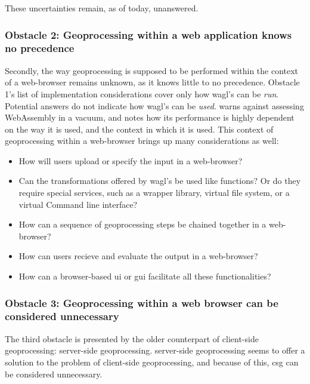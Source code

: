These uncertainties remain, as of today, unanswered.

\subsubsection*{Obstacle 2: Geoprocessing within a web application knows no precedence}

Secondly, the way geoprocessing is supposed to be performed within the context of a web-browser remains unknown, as it knows little to no precedence. Obstacle 1's list of implementation considerations cover only how \ac{wagl}'s can be \emph{run}. Potential answers do not indicate how \ac{wagl}'s can be \emph{used}. \cite{jangda_not_2019} warns against assessing WebAssembly in a vacuum, and notes how its performance is highly dependent on the way it is used, and the context in which it is used. This context of geoprocessing within a web-browser brings up many considerations as well: 

\begin{itemize}
  \item How will users upload or specify the input in a web-browser?
  \item Can the transformations offered by \ac{wagl}'s be used like functions? Or do they require special services, such as a wrapper library, virtual file system, or a virtual Command line interface? 
  \item How can a sequence of geoprocessing steps be chained together in a web-browser?
  \item How can users recieve and evaluate the output in a web-browser?
  \item How can a browser-based \ac{ui} or \ac{gui} facilitate all these functionalities?
\end{itemize}

\subsubsection*{Obstacle 3: Geoprocessing within a web browser can be considered unnecessary}

The third obstacle is presented by the older counterpart of client-side geoprocessing: server-side geoprocessing. server-side geoprocessing seems to offer a solution to the problem of client-side geoprocessing, and because of this, \ac{csg} can be considered unnecessary.

